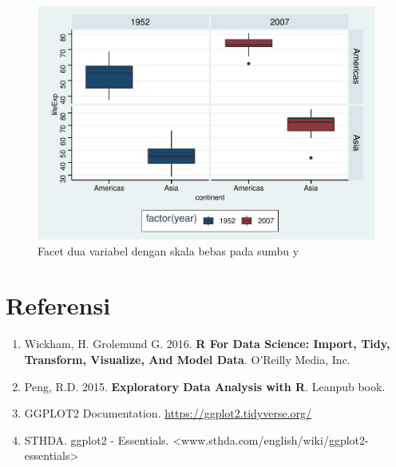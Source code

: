 \documentclass[]{book}
\providecommand{\tightlist}{%
  \setlength{\itemsep}{0pt}\setlength{\parskip}{0pt}}
\begin{document}
\begin{figure}

{\centering \includegraphics[width=0.8\linewidth]{EnvStat_files/figure-latex/ggfacetgrid4-1} 

}

\caption{Facet dua variabel dengan skala bebas pada sumbu y}\label{fig:ggfacetgrid4}
\end{figure}

\section{Referensi}\label{referensi-4}

\begin{enumerate}
\def\labelenumi{\arabic{enumi}.}
\tightlist
\item
  Wickham, H. Grolemund G. 2016. \textbf{R For Data Science: Import,
  Tidy, Transform, Visualize, And Model Data}. O'Reilly Media, Inc.
\item
  Peng, R.D. 2015. \textbf{Exploratory Data Analysis with R}. Leanpub
  book.
\item
  GGPLOT2 Documentation. \url{https://ggplot2.tidyverse.org/}
\item
  STHDA. ggplot2 - Essentials.
  \textless{}www.sthda.com/english/wiki/ggplot2-essentials\textgreater{}
\end{enumerate}


\end{document}
